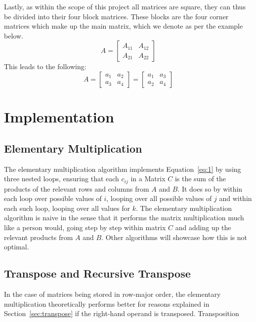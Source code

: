 \documentclass[12pt, a4paper]{article}
\begin{document}
Lastly, as within the scope of this project all matrices are square, they can thus be divided into their four block matrices. These blocks are the four corner matrices which make up the main matrix, which we denote as per the example below.
  $$
     A
     =
     \begin{bmatrix}
     A_{11} & A_{12}\\
     A_{21} & A_{22}
     \end{bmatrix}
 $$ 
This leads to the following: 
  $$
  A=
     \begin{bmatrix}
         a_1 & a_2\\ 
         a_3 & a_4 
     \end{bmatrix}
     =
     \begin{bmatrix}
     a_1 & a_3\\
     a_2 & a_4
     \end{bmatrix}
 $$ 

\section{Implementation}

\subsection{Elementary Multiplication}
\label{sec:elem_mult}
The elementary multiplication algorithm implements Equation~\ref{eq:1} by using three nested loops, ensuring that each $c_{ij}$ in a Matrix $C$ is the sum of the products of the relevant rows and columns from $A$ and $B$. It does so by within each loop over possible values of $i$, looping over all possible values of $j$ and within each such loop, looping over all values for $k$. The elementary multiplication algorithm is naive in the sense that it performs the matrix multiplication much like a person would, going step by step within matrix $C$ and adding up the relevant products from $A$ and $B$. Other algorithms will showcase how this is not optimal.

\subsection{Transpose and Recursive Transpose}
In the case of matrices being stored in row-major order, the elementary multiplication theoretically performs better for reasons explained in Section~\ref{sec:transpose} if the right-hand operand is transposed. Transposition 
\end{document}
